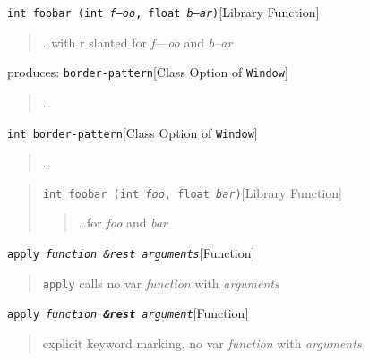 \documentclass{book}
\begin{document}
\noindent\texttt{int foobar (int \textnormal{\textsl{f---oo}}, float \textnormal{\textsl{b--ar}})}\hfill[Library Function]



%
\begin{quote}
\unskip{\parskip=0pt\noindent}%
\dots{}\@ with r slanted for \textsl{f---oo} and \textsl{b--ar}
\end{quote}

\noindent{}produces:
\noindent\texttt{border-pattern}\hfill[Class Option of \texttt{Window}]



%
\begin{quote}
\unskip{\parskip=0pt\noindent}%
\dots{}\@
\end{quote}

\noindent\texttt{\texttt{int} border-pattern}\hfill[Class Option of \texttt{Window}]



%
\begin{quote}
\unskip{\parskip=0pt\noindent}%
\dots{}\@
\end{quote}

\begin{quote}
\noindent\texttt{int foobar (int \textsl{foo}, float \textsl{bar})}\hfill[Library Function]



%
\begin{quote}
\unskip{\parskip=0pt\noindent}%
\dots{}\@ for \textsl{foo} and \textsl{bar}
\end{quote}
\end{quote}

\noindent\texttt{apply \EmbracOn{}\textnormal{\textsl{function \&rest arguments}}\EmbracOff{}}\hfill[Function]



%
\begin{quote}
\unskip{\parskip=0pt\noindent}%
\texttt{apply} calls no var \textsl{function} with \textsl{arguments}
\end{quote}

\noindent\texttt{apply \EmbracOn{}\textnormal{\textsl{function \EmbracOff{}\textnormal{\textbf{\&rest}}\EmbracOn{} argument}}\EmbracOff{}}\hfill[Function]



%
\begin{quote}
\unskip{\parskip=0pt\noindent}%
explicit keyword marking, no var \textsl{function} with \textsl{arguments}
\end{quote}
\end{document}
